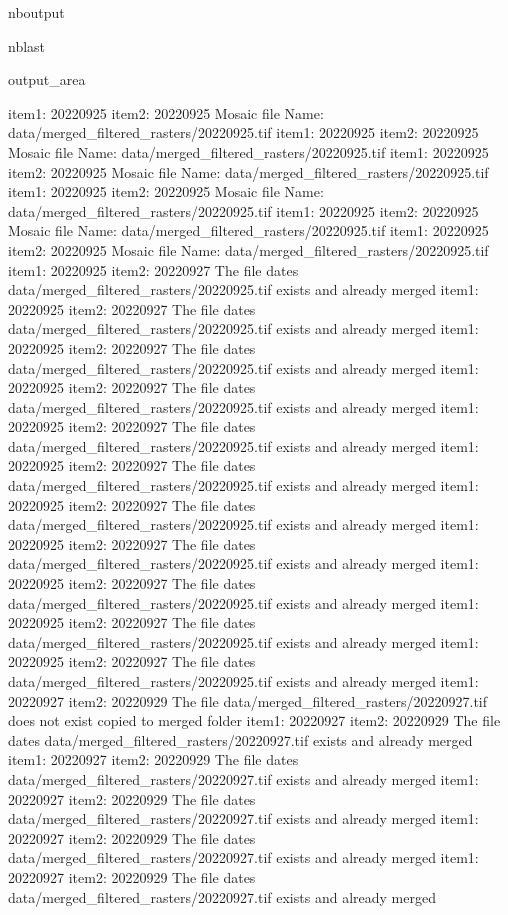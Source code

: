 \documentclass[letterpaper,10pt]{sphinxmanual}
\begin{document}
\begin{sphinxuseclass}{nboutput}
\begin{sphinxuseclass}{nblast}
{\begin{sphinxuseclass}{output_area}
\begin{sphinxuseclass}{}
\begin{sphinxVerbatim}[commandchars=\\\{\}]
item1:  20220925
item2:  20220925
Mosaic file Name:  data/merged\_filtered\_rasters/20220925.tif
item1:  20220925
item2:  20220925
Mosaic file Name:  data/merged\_filtered\_rasters/20220925.tif
item1:  20220925
item2:  20220925
Mosaic file Name:  data/merged\_filtered\_rasters/20220925.tif
item1:  20220925
item2:  20220925
Mosaic file Name:  data/merged\_filtered\_rasters/20220925.tif
item1:  20220925
item2:  20220925
Mosaic file Name:  data/merged\_filtered\_rasters/20220925.tif
item1:  20220925
item2:  20220925
Mosaic file Name:  data/merged\_filtered\_rasters/20220925.tif
item1:  20220925
item2:  20220927
The file dates data/merged\_filtered\_rasters/20220925.tif exists and already merged
item1:  20220925
item2:  20220927
The file dates data/merged\_filtered\_rasters/20220925.tif exists and already merged
item1:  20220925
item2:  20220927
The file dates data/merged\_filtered\_rasters/20220925.tif exists and already merged
item1:  20220925
item2:  20220927
The file dates data/merged\_filtered\_rasters/20220925.tif exists and already merged
item1:  20220925
item2:  20220927
The file dates data/merged\_filtered\_rasters/20220925.tif exists and already merged
item1:  20220925
item2:  20220927
The file dates data/merged\_filtered\_rasters/20220925.tif exists and already merged
item1:  20220925
item2:  20220927
The file dates data/merged\_filtered\_rasters/20220925.tif exists and already merged
item1:  20220925
item2:  20220927
The file dates data/merged\_filtered\_rasters/20220925.tif exists and already merged
item1:  20220925
item2:  20220927
The file dates data/merged\_filtered\_rasters/20220925.tif exists and already merged
item1:  20220925
item2:  20220927
The file dates data/merged\_filtered\_rasters/20220925.tif exists and already merged
item1:  20220925
item2:  20220927
The file dates data/merged\_filtered\_rasters/20220925.tif exists and already merged
item1:  20220927
item2:  20220929
The file data/merged\_filtered\_rasters/20220927.tif does not exist copied to merged folder
item1:  20220927
item2:  20220929
The file dates data/merged\_filtered\_rasters/20220927.tif exists and already merged
item1:  20220927
item2:  20220929
The file dates data/merged\_filtered\_rasters/20220927.tif exists and already merged
item1:  20220927
item2:  20220929
The file dates data/merged\_filtered\_rasters/20220927.tif exists and already merged
item1:  20220927
item2:  20220929
The file dates data/merged\_filtered\_rasters/20220927.tif exists and already merged
item1:  20220927
item2:  20220929
The file dates data/merged\_filtered\_rasters/20220927.tif exists and already merged

\end{sphinxVerbatim}
\end{sphinxuseclass}
\end{sphinxuseclass}}
\end{sphinxuseclass}
\end{sphinxuseclass}
\end{document}
